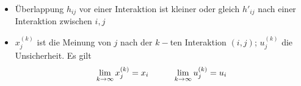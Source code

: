 	\begin{itemize}
		\item Überlappung $h_{ij}$ vor einer Interaktion ist kleiner oder gleich $h'_{ij}$ nach einer Interaktion zwischen $i,j$
		\item $x_j^{(k)}$ ist die Meinung von $j$ nach der $k-$ten Interaktion $(i,j)$; $u_j^{(k)}$ die Unsicherheit. Es gilt
		\[\lim\limits_{k\rightarrow\infty}x_j^{(k)}=x_i\hspace*{1cm}\lim\limits_{k\rightarrow\infty}u_j^{(k)}=u_i\]
	\end{itemize}
	\vspace*{-0.75\baselineskip}